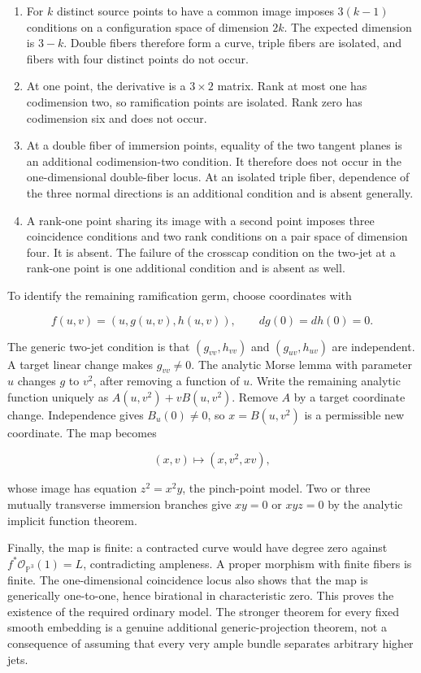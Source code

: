 \begin{enumerate}
\item
  For \(k\) distinct source points to have a common image imposes \(3(k-1)\) conditions on a configuration space of dimension \(2k\). The expected dimension is \(3-k\). Double fibers therefore form a curve, triple fibers are isolated, and fibers with four distinct points do not occur.
\item
  At one point, the derivative is a \(3\times2\) matrix. Rank at most one has codimension two, so ramification points are isolated. Rank zero has codimension six and does not occur.
\item
  At a double fiber of immersion points, equality of the two tangent planes is an additional codimension-two condition. It therefore does not occur in the one-dimensional double-fiber locus. At an isolated triple fiber, dependence of the three normal directions is an additional condition and is absent generally.
\item
  A rank-one point sharing its image with a second point imposes three coincidence conditions and two rank conditions on a pair space of dimension four. It is absent. The failure of the crosscap condition on the two-jet at a rank-one point is one additional condition and is absent as well.
\end{enumerate}

To identify the remaining ramification germ, choose coordinates with

\[
f(u,v)=(u,g(u,v),h(u,v)),\qquad dg(0)=dh(0)=0.
\]

The generic two-jet condition is that \((g_{vv},h_{vv})\) and \((g_{uv},h_{uv})\) are independent. A target linear change makes \(g_{vv}\ne0\). The analytic Morse lemma with parameter \(u\) changes \(g\) to \(v^2\), after removing a function of \(u\). Write the remaining analytic function uniquely as \(A(u,v^2)+vB(u,v^2)\). Remove \(A\) by a target coordinate change. Independence gives \(B_u(0)\ne0\), so \(x=B(u,v^2)\) is a permissible new coordinate. The map becomes

\[
(x,v)\longmapsto(x,v^2,xv),
\]

whose image has equation \(z^2=x^2y\), the pinch-point model. Two or three mutually transverse immersion branches give \(xy=0\) or \(xyz=0\) by the analytic implicit function theorem.

Finally, the map is finite: a contracted curve would have degree zero against \(f^*\mathcal O_{\mathbb P^3}(1)=L\), contradicting ampleness. A proper morphism with finite fibers is finite. The one-dimensional coincidence locus also shows that the map is generically one-to-one, hence birational in characteristic zero. This proves the existence of the required ordinary model. The stronger theorem for every fixed smooth embedding is a genuine additional generic-projection theorem, not a consequence of assuming that every very ample bundle separates arbitrary higher jets.

